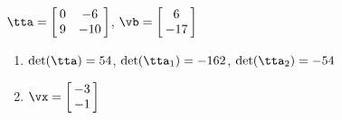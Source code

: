 {$\tta = \left[\hskip -3pt \begin{array}{cc} 0&-6\\  9&-10\end {array} \hskip -3pt
 \right]$,
 \quad
$\vb = \left[\hskip -3pt \begin{array}{c} 6\\  -17\end {array} \hskip -3pt
 \right]$}
{\begin{enumerate}
\item	$\det(\tta) = 54$, $\det(\tta_1) = -162$, $\det(\tta_2) = -54$
\item $\vx = \left[\hskip -3pt \begin{array}{c} -3\\  -1\end {array} \hskip -3pt
 \right]$
 \end{enumerate}
}
 
